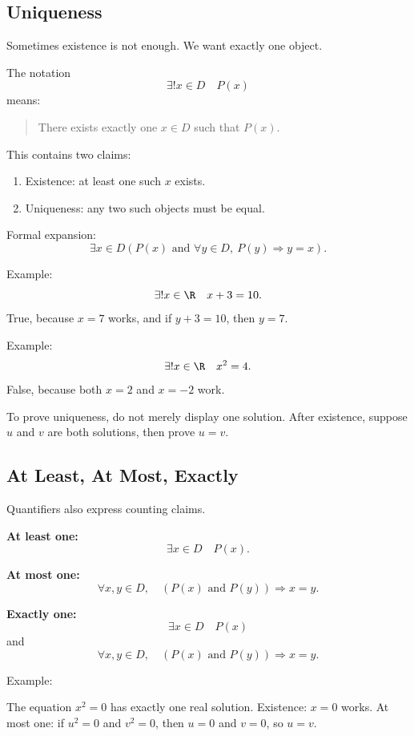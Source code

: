 \subsection{Uniqueness}

Sometimes existence is not enough. We want exactly one object.

The notation
\[
\exists!x\in D\quad P(x)
\]
means:

\begin{quote}
There exists exactly one $x\in D$ such that $P(x)$.
\end{quote}

This contains two claims:

\begin{enumerate}
\item Existence: at least one such $x$ exists.
\item Uniqueness: any two such objects must be equal.
\end{enumerate}

Formal expansion:
\[
\exists x\in D\left(P(x)\text{ and }\forall y\in D,\ P(y)\Rightarrow y=x\right).
\]

Example:
\[
\exists!x\in\R\quad x+3=10.
\]
True, because $x=7$ works, and if $y+3=10$, then $y=7$.

Example:
\[
\exists!x\in\R\quad x^2=4.
\]
False, because both $x=2$ and $x=-2$ work.

\begin{labbox}
To prove uniqueness, do not merely display one solution. After existence, suppose $u$ and $v$ are both solutions, then prove $u=v$.
\end{labbox}

\subsection{At Least, At Most, Exactly}

Quantifiers also express counting claims.

\textbf{At least one:}
\[
\exists x\in D\quad P(x).
\]

\textbf{At most one:}
\[
\forall x,y\in D,\quad (P(x)\text{ and }P(y))\Rightarrow x=y.
\]

\textbf{Exactly one:}
\[
\exists x\in D\quad P(x)
\]
and
\[
\forall x,y\in D,\quad (P(x)\text{ and }P(y))\Rightarrow x=y.
\]

Example:

The equation $x^2=0$ has exactly one real solution. Existence: $x=0$ works. At most one: if $u^2=0$ and $v^2=0$, then $u=0$ and $v=0$, so $u=v$.

